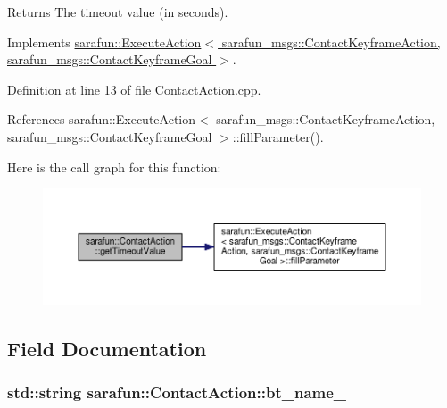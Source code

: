 \begin{DoxyReturn}{Returns}
The timeout value (in seconds). 
\end{DoxyReturn}


Implements \hyperlink{classsarafun_1_1ExecuteAction_aba6cfa8a8ce19e735eb6394424df6d17_aba6cfa8a8ce19e735eb6394424df6d17}{sarafun\-::\-Execute\-Action$<$ sarafun\-\_\-msgs\-::\-Contact\-Keyframe\-Action, sarafun\-\_\-msgs\-::\-Contact\-Keyframe\-Goal $>$}.



Definition at line 13 of file Contact\-Action.\-cpp.



References sarafun\-::\-Execute\-Action$<$ sarafun\-\_\-msgs\-::\-Contact\-Keyframe\-Action, sarafun\-\_\-msgs\-::\-Contact\-Keyframe\-Goal $>$\-::fill\-Parameter().



Here is the call graph for this function\-:\nopagebreak
\begin{figure}[H]
\begin{center}
\leavevmode
\includegraphics[width=350pt]{dc/d9f/classsarafun_1_1ContactAction_a85d81232d228fc6d2856d318d25c1bf9_a85d81232d228fc6d2856d318d25c1bf9_cgraph}
\end{center}
\end{figure}




\subsection{Field Documentation}
\hypertarget{classsarafun_1_1ContactAction_a71e5d4dc7682ec4dc8ca0b9b83ee214f_a71e5d4dc7682ec4dc8ca0b9b83ee214f}{
\subsubsection[{bt\-\_\-name\-\_\-}]{\setlength{\rightskip}{0pt plus 5cm}std\-::string sarafun\-::\-Contact\-Action\-::bt\-\_\-name\-\_\-\hspace{0.3cm}{\ttfamily [private]}}}\label{classsarafun_1_1ContactAction_a71e5d4dc7682ec4dc8ca0b9b83ee214f_a71e5d4dc7682ec4dc8ca0b9b83ee214f}


